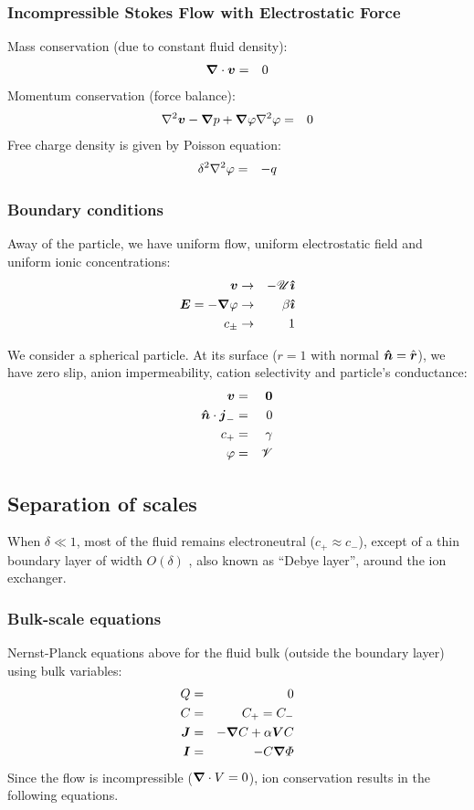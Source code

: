 \subsubsection{Incompressible Stokes Flow with Electrostatic Force}
Mass conservation (due to constant fluid density):
\begin{eqnarray}
\boldsymbol{\nabla} \cdot \boldsymbol{v} &=& 0
\end{eqnarray}
Momentum conservation (force balance):
\begin{eqnarray}
\nabla^2 \boldsymbol{v} - \boldsymbol{\nabla} p + \boldsymbol{\nabla} \varphi \nabla^2 \varphi &=& 0
\end{eqnarray}
Free charge density is given by Poisson equation:
\begin{eqnarray}
\delta^2 \nabla^2 \varphi &=& -q
\end{eqnarray}

\subsubsection{Boundary conditions}
Away of the particle, we have uniform flow, uniform electrostatic field
and uniform ionic concentrations:
\begin{eqnarray}
\boldsymbol{v} &\rightarrow& -\mathscr{U} \boldsymbol{\hat{\imath}} \\
\boldsymbol{E} = -\boldsymbol{\nabla} \varphi &\rightarrow& \beta\boldsymbol{\hat{\imath}} \\
c_\pm &\rightarrow& 1
\end{eqnarray}

We consider a spherical particle. At its surface ($r=1$ with normal $\boldsymbol{\hat{n}} = \hat{\boldsymbol{r}}$), 
we have zero slip, anion impermeability, cation selectivity and particle's conductance:
\begin{eqnarray}
\boldsymbol{v} & = & \boldsymbol{0} \\
\boldsymbol{\hat{n}} \cdot \boldsymbol{j}_- & = & 0 \\
c_+ & = & \gamma \\
\varphi & = & \mathscr{V}
\end{eqnarray}

\subsection{Separation of scales}
When $\delta \ll 1$, 
most of the fluid remains electroneutral ($c_+ \approx c_-$), 
except of a thin boundary layer of width $O(\delta)$ 
, also known as ``Debye layer'', around the ion exchanger. 

\subsubsection  {Bulk-scale equations}
Nernst-Planck equations above for the fluid bulk (outside
the boundary layer) using bulk variables:
\begin{eqnarray}
  Q & = & 0 \\
  C & = & C_+ = C_- \\
\boldsymbol{J} &=& -\boldsymbol{\nabla} C + \alpha \boldsymbol{V} C \\
\boldsymbol{I} &=& -C \boldsymbol{\nabla} \varPhi
\end{eqnarray}
Since the flow is incompressible ($\boldsymbol{\nabla} \cdot V = 0$), 
ion conservation results in the following equations.

